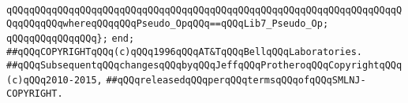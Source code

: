 \verb|qQQqqQQqqQQqqQQqqQQqqQQqqQQqqQQqqQQqqQQqqQQqqQQqqQQqqQQqqQQqqQQqqQQqqQQqqQQqqQQqwhereqQQqqQQqPseudo_OpqQQq==qQQqLib7_Pseudo_Op;|\newline
\verb|qQQqqQQqqQQqqQQq};|\newline
\verb|end;|\newline
\newline
\newline
\newline
\newline
\newline
\verb|##qQQqCOPYRIGHTqQQq(c)qQQq1996qQQqAT&TqQQqBellqQQqLaboratories.|\newline
\verb|##qQQqSubsequentqQQqchangesqQQqbyqQQqJeffqQQqProtheroqQQqCopyrightqQQq(c)qQQq2010-2015,|\newline
\verb|##qQQqreleasedqQQqperqQQqtermsqQQqofqQQqSMLNJ-COPYRIGHT.|\newline

